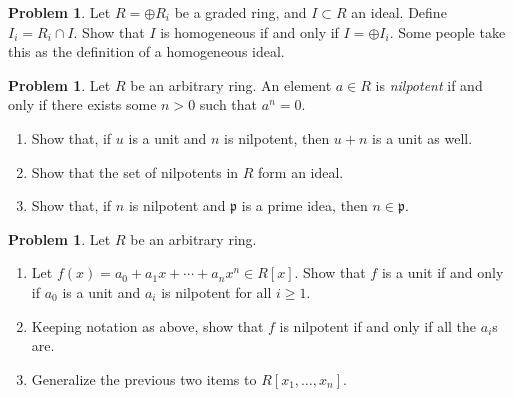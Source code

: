 \documentclass[11pt]{article}
\theoremstyle{definition}
\newtheorem{problem}[theorem]{Problem}
\theoremstyle{definition}
\begin{document}
\begin{problem}
Let $R = \oplus R_i$ be a graded ring, and $I \subset R$ an ideal.  Define $I_i = R_i \cap I$.  Show that $I$ is homogeneous if and only if $I = \oplus I_i$.  Some people take this as the definition of a homogeneous ideal.
\end{problem}
\begin{problem}
Let $R$ be an arbitrary ring.  An element $a \in R$ is \emph{nilpotent} if and only if there exists some $n >0$ such that $a^n = 0$.
\begin{enumerate}[label=(\alph*)]
\item Show that, if $u$ is a unit and $n$ is nilpotent, then $u+n$ is a unit as well.
\item Show that the set of nilpotents in $R$ form an ideal.
\item Show that, if $n$ is nilpotent and $\mathfrak{p}$ is a prime idea, then $n \in \mathfrak{p}$.
\end{enumerate}
\end{problem}
\begin{problem}
Let $R$ be an arbitrary ring.
\begin{enumerate}[label=(\alph*)]
\item Let $f(x) = a_0 + a_1 x + \cdots + a_n x^n \in R[x]$.  Show that $f$ is a unit if and only if $a_0$ is a unit and $a_i$ is nilpotent for all $i \geq 1$.
\item Keeping notation as above, show that $f$ is nilpotent if and only if all the $a_i$s are.
\item Generalize the previous two items to $R[x_1, \ldots, x_n]$.
\end{enumerate}
\end{problem}
\end{document}
